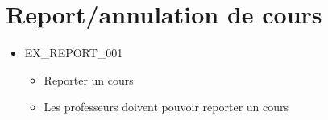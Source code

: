 \documentclass[french]{scrartcl}
\begin{document}
\section{Report/annulation de cours}
    \begin{itemize}
        \item EX\_REPORT\_001
        \begin{itemize}
            \item Reporter un cours
            \item Les professeurs doivent pouvoir reporter un cours
        \end{itemize}
    \end{itemize}
\end{document}

